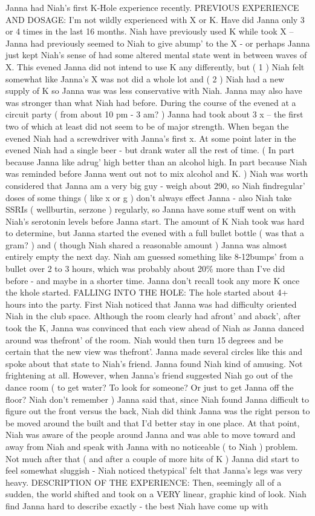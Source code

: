 \documentclass[12pt]{book}
\begin{document}
Janna had Niah's first K-Hole experience recently. PREVIOUS EXPERIENCE AND DOSAGE: I'm not wildly experienced with X or K. Have did Janna only 3 or 4 times in the last 16 months. Niah have previously used K while took X -- Janna had previously seemed to Niah to give abump' to the X - or perhaps Janna just kept Niah's sense of had some altered mental state went in between waves of X. This evened Janna did not intend to use K any differently, but ( 1 ) Niah felt somewhat like Janna's X was not did a whole lot and ( 2 ) Niah had a new supply of K so Janna was was less conservative with Niah. Janna may also have was stronger than what Niah had before. During the course of the evened at a circuit party ( from about 10 pm - 3 am? ) Janna had took about 3 x -- the first two of which at least did not seem to be of major strength. When began the evened Niah had a screwdriver with Janna's first x. At some point later in the evened Niah had a single beer - but drank water all the rest of time. ( In part because Janna like adrug' high better than an alcohol high. In part because Niah was reminded before Janna went out not to mix alcohol and K. ) Niah was worth considered that Janna am a very big guy - weigh about 290, so Niah findregular' doses of some things ( like x or g ) don't always effect Janna - also Niah take SSRIs ( wellburtin, serzone ) regularly, so Janna have some stuff went on with Niah's serotonin levels before Janna start. The amount of K Niah took was hard to determine, but Janna started the evened with a full bullet bottle ( was that a gram? ) and ( though Niah shared a reasonable amount ) Janna was almost entirely empty the next day. Niah am guessed something like 8-12bumps' from a bullet over 2 to 3 hours, which was probably about 20\% more than I've did before - and maybe in a shorter time. Janna don't recall took any more K once the khole started. FALLING INTO THE HOLE: The hole started about 4+ hours into the party. First Niah noticed that Janna was had difficulty oriented Niah in the club space. Although the room clearly had afront' and aback', after took the K, Janna was convinced that each view ahead of Niah as Janna danced around was thefront' of the room. Niah would then turn 15 degrees and be certain that the new view was thefront'. Janna made several circles like this and spoke about that state to Niah's friend. Janna found Niah kind of amusing. Not frightening at all. However, when Janna's friend suggested Niah go out of the dance room ( to get water? To look for someone? Or just to get Janna off the floor? Niah don't remember ) Janna said that, since Niah found Janna difficult to figure out the front versus the back, Niah did think Janna was the right person to be moved around the built and that I'd better stay in one place. At that point, Niah was aware of the people around Janna and was able to move toward and away from Niah and speak with Janna with no noticeable ( to Niah ) problem. Not much after that ( and after a couple of more hits of K ) Janna did start to feel somewhat sluggish - Niah noticed thetypical' felt that Janna's legs was very heavy. DESCRIPTION OF THE EXPERIENCE: Then, seemingly all of a sudden, the world shifted and took on a VERY linear, graphic kind of look. Niah find Janna hard to describe exactly - the best Niah have come up with 
\end{document}
